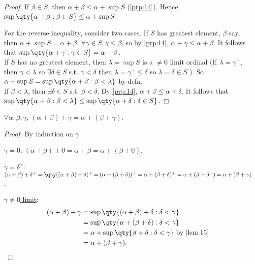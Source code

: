\begin{proof}
    If $\beta \in S$, then $\alpha + \beta \leq \alpha + \sup S$ (\cref{prp:14}).
    Hence $\sup \qty{\alpha + \beta : \beta \in S} \leq \alpha + \sup S$.

    For the reverse inequality, consider two cases.
    If $S$ has greatest element, $\beta$ say, then $\alpha + \sup S = \alpha + \beta$.
    $\forall \gamma \in S, \gamma \leq \beta$, so by \cref{prp:14}, $\alpha + \gamma \leq \alpha + \beta$.
    It follows that $\sup\qty{\alpha + \gamma : \gamma \in S} = \alpha + \beta$. \\
    If $S$ has no greatest element, then $\lambda = \sup S$ is a $\neq 0$ limit ordinal (If $\lambda = \gamma^+$, then $\gamma < \lambda$ so $\exists \delta \in S$ s.t. $\gamma < \delta$ then $\lambda = \gamma^+ \leq \delta$ so $\lambda = \delta \in S$ \Lightning).
    So $\alpha + \sup S = \sup \qty{\alpha + \beta : \beta < \lambda}$ by defn. \\
    If $\beta < \lambda$, then $\exists \delta \in S$ s.t. $\beta < \delta$.
    By \cref{prp:14}, $\alpha + \beta \leq \alpha + \delta$.
    It follows that $\sup \qty{\alpha + \beta : \beta < \lambda} \leq \sup \qty{\alpha + \delta : \delta \in S}$.
\end{proof}

\begin{proposition} \label{prp:16}
    $\forall \alpha, \beta, \gamma$, $(\alpha + \beta) + \gamma = \alpha + (\beta + \gamma)$.
\end{proposition}

\begin{proof}
    By induction on $\gamma$.

    \underline{$\gamma = 0$}: $(\alpha + \beta) + 0 = \alpha + \beta = \alpha + (\beta + 0)$.

    \underline{$\gamma = \delta^+$}: $(\alpha + \beta) + \delta^+ = \qty((\alpha + \beta) + \delta)^+ = (\alpha + (\beta + \delta))^+ = \alpha + (\beta + \delta)^+ = \alpha + (\beta + \delta^+) = \alpha + (\beta + \gamma)$.

    \underline{$\gamma \neq 0$ limit}:
    \begin{align*}
        (\alpha + \beta) + \gamma &= \sup \qty{(\alpha + \beta) + \delta : \delta < \gamma} \\
        &= \sup \qty{\alpha + (\beta + \delta) : \delta < \gamma} \\
        &= \alpha + \sup\qty{\beta + \delta : \delta < \gamma} \text{ by \cref{lem:15}} \\
        &= \alpha + (\beta + \gamma).
    \end{align*}
\end{proof}

